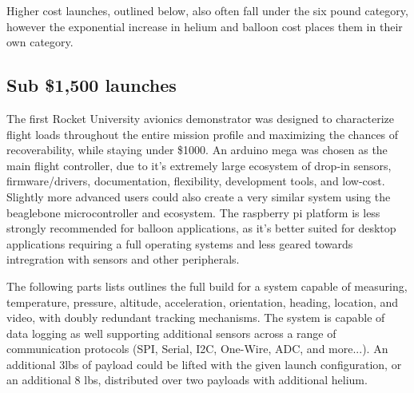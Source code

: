\documentclass[heading.tex]{subfiles}
\begin{document}
Higher cost launches, outlined below, also often fall under the six pound
category, however the exponential increase in helium and balloon cost places
them in their own category.

\subsection{Sub \$1,500 launches}

The first Rocket University avionics demonstrator was designed to characterize
flight loads throughout the entire mission profile and maximizing the chances
of recoverability, while staying under \$1000. An arduino mega was chosen as
the main flight controller, due to it's extremely large ecosystem of drop-in
sensors, firmware/drivers, documentation, flexibility, development tools,
and low-cost. Slightly more advanced users could also create a very similar
system using the beaglebone microcontroller and ecosystem. The raspberry pi
platform is less strongly recommended for balloon applications, as it's better
suited for desktop applications requiring a full operating systems and less
geared towards intregration with sensors and other peripherals.

The following parts lists outlines the full build for a system capable of
measuring, temperature, pressure, altitude, acceleration, orientation, heading,
location, and video, with doubly redundant tracking mechanisms. The system
is capable of data logging as well supporting additional sensors across a range
of communication protocols (SPI, Serial, I2C, One-Wire, ADC, and more...).
An additional 3lbs of payload could be lifted with the given launch configuration,
or an additional 8 lbs, distributed over two payloads with additional helium.
\end{document}
